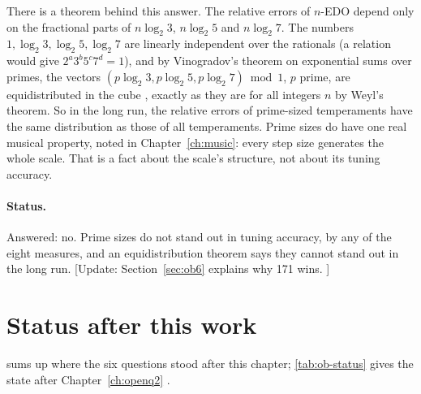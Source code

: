 There is a theorem behind this answer. The relative errors of $n$-EDO depend only on the fractional parts of $n\log_2 3$, $n\log_2 5$ and $n\log_2 7$. The numbers $1, \log_2 3, \log_2 5, \log_2 7$ are linearly independent over the rationals (a relation would give $2^a 3^b 5^c 7^d = 1$), and by Vinogradov's theorem on exponential sums over primes, the vectors $(p\log_2 3, p\log_2 5, p\log_2 7) \bmod 1$, $p$ prime, are equidistributed in the cube \citep{Vinogradov1954}, exactly as they are for all integers $n$ by Weyl's theorem. So in the long run, the relative errors of prime-sized temperaments have the same distribution as those of all temperaments. Prime sizes do have one real musical property, noted in Chapter~\ref{ch:music}: every step size generates the whole scale. That is a fact about the scale's structure, not about its tuning accuracy.

\paragraph{Status.} Answered: no. Prime sizes do not stand out in tuning accuracy, by any of the eight measures, and an equidistribution theorem says they cannot stand out in the long run. [Update: Section~\ref{sec:ob6} explains why 171 wins. \addedon{\revB}]

\section{Status after this work}\label{sec:oq-status}

 sums up where the six questions stood after this chapter; \cref{tab:ob-status} gives the state after Chapter~\ref{ch:openq2} \addedon{\revB}.

